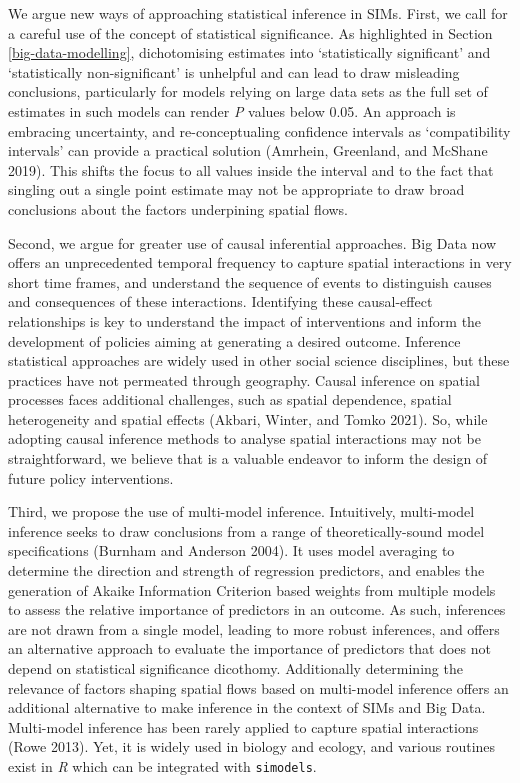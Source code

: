 \documentclass[11pt,letterpaper]{article}
\begin{document}
We argue new ways of approaching statistical inference in SIMs.
First, we call for a careful use of the concept of statistical significance.
As highlighted in Section \ref{big-data-modelling}, dichotomising estimates into `statistically significant' and `statistically non-significant' is unhelpful and can lead to draw misleading conclusions, particularly for models relying on large data sets as the full set of estimates in such models can render \emph{P} values below 0.05.
An approach is embracing uncertainty, and re-conceptualing confidence intervals as `compatibility intervals' can provide a practical solution (Amrhein, Greenland, and McShane 2019).
This shifts the focus to all values inside the interval and to the fact that singling out a single point estimate may not be appropriate to draw broad conclusions about the factors underpining spatial flows.

Second, we argue for greater use of causal inferential approaches.
Big Data now offers an unprecedented temporal frequency to capture spatial interactions in very short time frames, and understand the sequence of events to distinguish causes and consequences of these interactions.
Identifying these causal-effect relationships is key to understand the impact of interventions and inform the development of policies aiming at generating a desired outcome.
Inference statistical approaches are widely used in other social science disciplines, but these practices have not permeated through geography.
Causal inference on spatial processes faces additional challenges, such as spatial dependence, spatial heterogeneity and spatial effects (Akbari, Winter, and Tomko 2021).
So, while adopting causal inference methods to analyse spatial interactions may not be straightforward, we believe that is a valuable endeavor to inform the design of future policy interventions.

Third, we propose the use of multi-model inference.
Intuitively, multi-model inference seeks to draw conclusions from a range of theoretically-sound model specifications (Burnham and Anderson 2004).
It uses model averaging to determine the direction and strength of regression predictors, and enables the generation of Akaike Information Criterion based weights from multiple models to assess the relative importance of predictors in an outcome.
As such, inferences are not drawn from a single model, leading to more robust inferences, and offers an alternative approach to evaluate the importance of predictors that does not depend on statistical significance dicothomy.
Additionally determining the relevance of factors shaping spatial flows based on multi-model inference offers an additional alternative to make inference in the context of SIMs and Big Data.
Multi-model inference has been rarely applied to capture spatial interactions (Rowe 2013).
Yet, it is widely used in biology and ecology, and various routines exist in \emph{R} which can be integrated with \texttt{simodels}.
\end{document}
